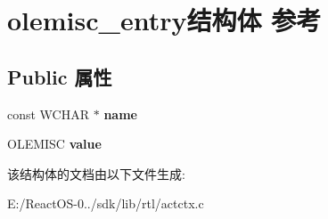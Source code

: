 \hypertarget{structolemisc__entry}{}\section{olemisc\+\_\+entry结构体 参考}
\label{structolemisc__entry}
\subsection*{Public 属性}
\begin{DoxyCompactItemize}
\item 
\mbox{\label{structolemisc__entry_a3480dbca1817e9bfaa5dd6d25c1170f3}} 
const W\+C\+H\+AR $\ast$ {\bfseries name}
\item 
\mbox{\label{structolemisc__entry_a41e08a3b550803c0c6c8857a47da0fa7}} 
O\+L\+E\+M\+I\+SC {\bfseries value}
\end{DoxyCompactItemize}


该结构体的文档由以下文件生成\+:\begin{DoxyCompactItemize}
\item 
E\+:/\+React\+O\+S-\/0../sdk/lib/rtl/actctx.\+c\end{DoxyCompactItemize}

